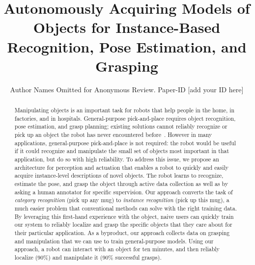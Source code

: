 \documentclass[conference]{IEEEtran}
\newcommand{\mytitle}[0]{Autonomously Acquiring Models of Objects for Instance-Based
  Recognition, Pose Estimation, and Grasping}
\begin{document}


\title{\mytitle{}}

\author{Author Names Omitted for Anonymous Review. Paper-ID [add your ID here]}

\maketitle


\begin{abstract}
Manipulating objects is an important task for robots that help people
in the home, in factories, and in hospitals.  General-purpose
pick-and-place requires object recognition, pose estimation, and grasp
planning; existing solutions cannot reliably recognize or pick up an
object the robot has never encountered before~\citep{}.  However in
many applications, general-purpose pick-and-place is not required: the
robot would be useful if it could recognize and manipulate the small
set of objects most important in that application, but do so with high
reliability.  To address this issue, we propose an architecture for
perception and actuation that enables a robot to quickly and easily
acquire instance-level descriptions of novel objects.  The robot
learns to recognize, estimate the pose, and grasp the object through
active data collection as well as by asking a human annotator for
specific supervision.  Our approach converts the task of {\em
  category recognition} (pick up any mug) to {\em instance
  recognition} (pick up this mug), a much easier problem that conventional
methods can solve with the right training data.  By leveraging
this first-hand experience with the object, naive users can
quickly train our system to reliably localize and grasp the specific
objects that they care about for their particular application.
As a byproduct, our approach collects data on grasping and
manipulation that we can use to train general-purpose models. Using
our approach, a robot can interact with an object for ten minutes, and
then reliably localize (90\%) and manipulate it (90\% successful
grasps).


\end{abstract}
\end{document}
